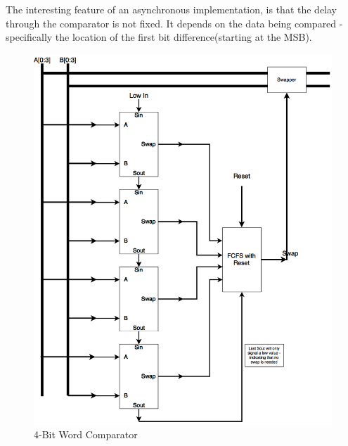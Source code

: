 \documentclass[11pt]{scrartcl}
\begin{document}
The interesting feature of an asynchronous implementation, is that the delay through the comparator is not fixed.  It depends on the data being compared - specifically the location of the first bit difference(starting at the MSB).

\begin{figure}[hbtp]
\centering
\includegraphics[scale=.40]{Word_Comparator_Block_Diagram.png}
\caption{4-Bit Word Comparator}
\end{figure}
\end{document}
